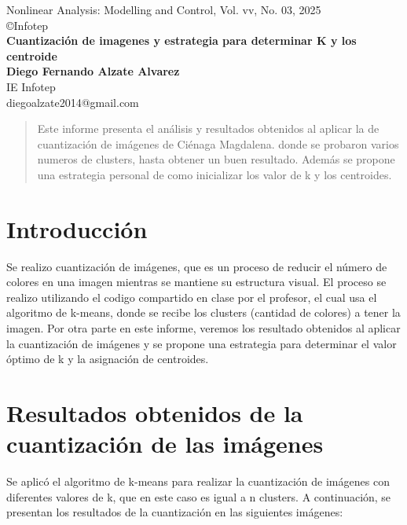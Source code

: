 \documentclass[a4paper, 10pt]{article}
\begin{document}
\begin{center}
Nonlinear Analysis: Modelling and Control, Vol. vv, No. 03, 2025\\
\copyright\IE Infotep\\[24pt]
\LARGE
\textbf{Cuantización de imagenes y estrategia para determinar K y los centroide}\\[6pt]
\small
\textbf {Diego Fernando Alzate Alvarez}\\[6pt]
IE Infotep \\ diegoalzate2014@gmail.com\\[6pt]
\end{center}

\begin{abstract}
Este informe presenta el análisis y resultados obtenidos al aplicar la de cuantización de imágenes de Ciénaga Magdalena. donde se probaron varios numeros de clusters, hasta obtener un buen resultado. Además se propone una estrategia personal de como inicializar los valor de k y los centroides. \vskip 2mm
\end{abstract}

\section{Introducción}
Se realizo cuantización de imágenes, que es un proceso de reducir el número de colores en una imagen mientras se mantiene su estructura visual. El proceso se realizo utilizando el codigo compartido en clase por el profesor, el cual usa el algoritmo de k-means, donde se recibe los clusters (cantidad de colores) a tener la imagen. Por otra parte en este informe, veremos los resultado obtenidos al aplicar la cuantización de imágenes y se propone una estrategia para determinar el valor óptimo de k y la asignación de centroides.

\section{Resultados obtenidos de la cuantización de las imágenes}
Se aplicó el algoritmo de k-means para realizar la cuantización de imágenes con diferentes valores de k, que en este caso es igual a n clusters. A continuación, se presentan los resultados de la cuantización en las siguientes imágenes:
\end{document}
